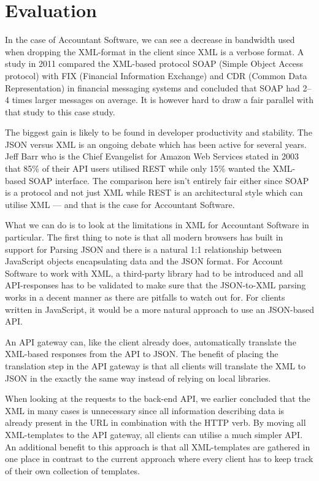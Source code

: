 \documentclass{cslthse-msc}
\begin{document}
\section{Evaluation}

In the case of Accountant Software, we can see a decrease in bandwidth used when dropping the XML-format in the client since XML is a verbose format. A study in 2011 compared the XML-based protocol SOAP (Simple Object Access protocol) with FIX (Financial Information Exchange) and CDR (Common Data Representation) in financial messaging systems and concluded that SOAP had 2--4 times larger messages on average\cite{soap_fix}. It is however hard to draw a fair parallel with that study to this case study.


The biggest gain is likely to be found in developer productivity and stability. The JSON versus XML is an ongoing debate which has been active for several years. Jeff Barr who is the Chief Evangelist for Amazon Web Services stated in 2003 that 85\% of their API users utilised REST while only 15\% wanted the XML-based SOAP interface\cite{soap_amazon}. The comparison here isn't entirely fair either since SOAP is a protocol and not just XML while REST is an architectural style which can utilise XML --- and that is the case for Accountant Software.

What we can do is to look at the limitations in XML for Accountant Software in particular. The first thing to note is that all modern browsers has built in support for Parsing JSON and there is a natural 1:1 relationship between JavaScript objects encapsulating data and the JSON format. For Account Software to work with XML, a third-party library had to be introduced and all API-responses has to be validated to make sure that the JSON-to-XML parsing works in a decent manner as there are pitfalls to watch out for. For clients written in JavaScript, it would be a more natural approach to use an JSON-based API. 

An API gateway can, like the client already does, automatically translate the XML-based responses from the API to JSON. The benefit of placing the translation step in the API gateway is that all clients will translate the XML to JSON in the exactly the same way instead of relying on local libraries.

When looking at the requests to the back-end API, we earlier concluded that the XML in many cases is unnecessary since all information describing data is already present in the URL in combination with the HTTP verb. By moving all XML-templates to the API gateway, all clients can utilise a much simpler API. An additional benefit to this approach is that all XML-templates are gathered in one place in contrast to the current approach where every client has to keep track of their own collection of templates.
\end{document}
